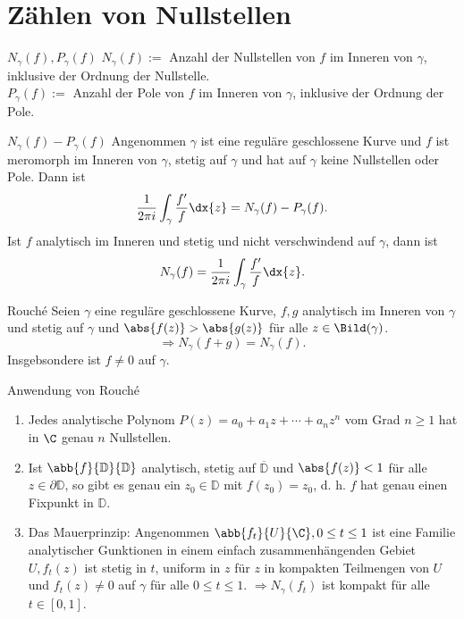\section{Zählen von Nullstellen}

\begin{karte}{\(N_\gamma(f), P_\gamma(f)\)}
    \(N_\gamma(f) :=\) Anzahl der Nullstellen von \(f\) im Inneren von 
    \(\gamma\), inklusive der Ordnung der Nullstelle. \\
    \(P_\gamma(f) :=\) Anzahl der Pole von \(f\) im Inneren von 
    \(\gamma\), inklusive der Ordnung der Pole.
\end{karte}

\begin{karte}{\(N_\gamma(f) - P_\gamma(f)\)}
    Angenommen \(\gamma\) ist eine reguläre geschlossene Kurve und 
    \(f\) ist meromorph im Inneren von \(\gamma\), stetig auf \(\gamma\) 
    und hat auf \(\gamma\) keine Nullstellen oder Pole. Dann ist 
    \[ \frac{1}{2\pi i}\int_\gamma \frac{f'}{f} \dx{z} = N_\gamma(f) - P_\gamma(f). \]
    Ist \(f\) analytisch im Inneren und stetig und nicht verschwindend auf \(\gamma\), 
    dann ist 
    \[N_\gamma(f) = \frac{1}{2\pi i} \int_\gamma \frac{f'}{f}\dx{z}.\]
\end{karte}

\begin{karte}{Rouché}
    Seien \(\gamma\) eine reguläre geschlossene Kurve, \(f,g\) analytisch 
    im Inneren von \(\gamma\) und stetig auf \(\gamma\) und \(\abs{f(z)} > \abs{g(z)}\) 
    für alle \(z\in \Bild(\gamma)\).
    \[ \Rightarrow N_\gamma(f+g) = N_\gamma(f). \]
    Insgebsondere ist \(f\neq 0\) auf \(\gamma\).
\end{karte}

\begin{karte}{Anwendung von Rouché}
    \begin{enumerate}
        \item Jedes analytische Polynom \(P(z) = a_0 + a_1 z + \cdots + a_n z^n\) 
        vom Grad \(n\geq 1\) hat in \(\C\) genau \(n\) Nullstellen. 
        \item Ist \(\abb{f}{\mathbb{D}}{\mathbb{D}}\) analytisch, stetig auf 
        \(\overline{\mathbb{D}}\) und \(\abs{f(z)} < 1\) für alle \(z\in \partial \mathbb{D}\), 
        so gibt es genau ein \(z_0 \in \mathbb{D}\) mit \(f(z_0) = z_0\), d. h. \(f\) 
        hat genau einen Fixpunkt in \(\mathbb{D}\).
        \item Das Mauerprinzip: Angenommen \(\abb{f_t}{U}{\C}, 0 \leq t \leq 1\) 
        ist eine Familie analytischer Gunktionen in einem einfach zusammenhängenden 
        Gebiet \(U, f_t(z) \) ist stetig in \(t\), uniform in \(z\) für \(z\) in 
        kompakten Teilmengen von \(U\) und \(f_t(z) \neq 0\) auf \(\gamma\) für alle 
        \(0\leq t \leq 1\). \(\Rightarrow N_\gamma(f_t)\) ist kompakt für alle \(t\in [0,1]\).
    \end{enumerate}
\end{karte}